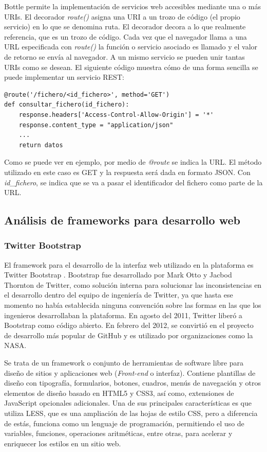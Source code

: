 Bottle permite la implementación de servicios web accesibles mediante una o más URIs. El decorador \textit{route()} asigna una URI a un trozo de código (el propio servicio) en lo que se denomina ruta. El decorador decora a lo que realmente referencia, que es un trozo de código. Cada vez que el navegador llama a una URL especificada con \textit{route()} la función o servicio asociado es llamado y el valor de retorno se envía al navegador. A un mismo servicio se pueden unir tantas URIs como se desean. El siguiente código muestra cómo de una forma sencilla se puede implementar un servicio REST:

\begin{lstlisting}
@route('/fichero/<id_fichero>', method='GET')
def consultar_fichero(id_fichero):
    response.headers['Access-Control-Allow-Origin'] = '*'
    response.content_type = "application/json"
    ...
    return datos
\end{lstlisting}

Como se puede ver en ejemplo, por medio de \textit{@route} se indica la URL. El método utilizado en este caso es GET y la respuesta será dada en formato JSON. Con \textit{id\_fichero}, se indica que se va a pasar el identificador del fichero como parte de la URL.

\subsection{Análisis de frameworks para desarrollo web}

\subsubsection{\textbf{Twitter Bootstrap}}
El framework para el desarrollo de la interfaz web utilizado en la plataforma es Twitter Bootstrap \cite{bootstrap}. Bootstrap fue desarrollado por Mark Otto y Jacbod Thornton de Twitter, como solución interna para solucionar las inconsistencias en el desarrollo dentro del equipo de ingeniería de Twitter, ya que hasta ese momento no había establecida ninguna convención sobre las formas en las que los ingenieros desarrollaban la plataforma. En agosto del 2011, Twitter liberó a Bootstrap como código abierto. En febrero del 2012, se convirtió en el proyecto de desarrollo más popular de GitHub \cite{github} y es utilizado por organizaciones como la NASA.

Se trata de un framework o conjunto de herramientas de software libre para diseño de sitios y aplicaciones web (\textit{Front-end} o interfaz). Contiene plantillas de diseño con tipografía, formularios, botones, cuadros, menús de navegación y otros elementos de diseño basado en HTML5 y CSS3, así como, extensiones de JavaScript opcionales adicionales. Una de sus principales características es que utiliza LESS, que es una ampliación de las hojas de estilo CSS, pero a diferencia de estás, funciona como un lenguaje de programación, permitiendo el uso de variables, funciones, operaciones aritméticas, entre otras, para acelerar y enriquecer los estilos en un sitio web.

